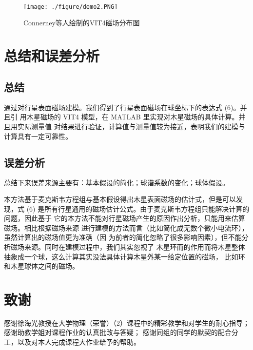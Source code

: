 \documentclass{article}
\begin{document}
\begin{figure}
    \centering
    \texttt{[image: ./figure/demo2.PNG]}
    \caption{Connerney等人绘制的VIT4磁场分布图}
    \label{fig:my_label}
\end{figure}



\section{总结和误差分析}
\subsection{总结}
   通过对行星表面磁场建模。我们得到了行星表面磁场在球坐标下的表达式 (6)。并且引
用木星磁场的 VIT4 模型，在 MATLAB 里实现对木星磁场的具体计算。并且用实际测量值
对结果进行验证，计算值与测量值较为接近，表明我们的建模与计算具有一定可靠性。

\subsection{误差分析}
总结下来误差来源主要有：基本假设的简化；球谐系数的变化；球体假设。


本方法基于麦克斯韦方程组与基本假设得出木星表面磁场的估计式，但是可以发现，式
(6) 是所有行星通用的磁场估计公式。由于麦克斯韦方程组只能解决计算的问题，因此基于
它的本方法不能对行星磁场产生的原因作出分析，只能用来估算磁场。相比根据磁场来源
进行建模的方法而言（比如简化成无数个微小电流环），虽然计算出的磁场值更为准确（因
为前者的简化忽略了很多影响因素），但不能分析磁场来源。同时在建模过程中，我们其实忽视了
木星环而的作用而将木星整体抽象成一个球，这么计算其实没法具体计算木星外某一给定位置的磁场，
比如环和木星球体之间的磁场。



\section{致谢}
   感谢徐海光教授在大学物理（荣誉）（2）课程中的精彩教学和对学生的耐心指导；
感谢助教学姐对课程作业的认真批改与答疑；
感谢同组的同学的默契的配合分工，以及对本人完成课程大作业给予的帮助。
\end{document}
